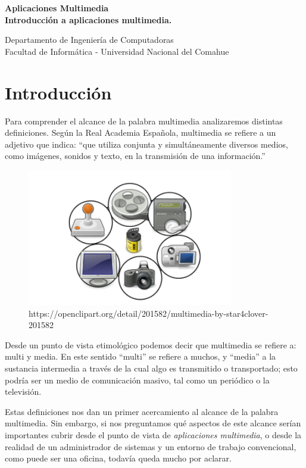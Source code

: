 \documentclass[12pt]{article}
\def\maketitle{

 \makeatletter
 {\color{bl} \centering \huge \sc \textbf{
  Aplicaciones Multimedia\\ 
\large \vspace*{-8pt} \color{black}Introducción a aplicaciones multimedia. 
 \vspace*{8pt} }\par}
 \makeatother

\makeatletter
 {\centering \small 
 	Departamento de Ingeniería de Computadoras \\
 	Facultad de Informática - Universidad Nacional del Comahue \\
 	\vspace{20pt} }
 \makeatother

}
\begin{document}
\thispagestyle{empty}
\maketitle
\setlength{\parindent}{0pt}

\section*{Introducción}

Para comprender el alcance de la palabra multimedia analizaremos distintas 
definiciones. Según la Real Academia Española, multimedia se refiere a un 
adjetivo que indica: ``que utiliza conjunta y simultáneamente diversos 
medios, como imágenes, sonidos y texto, en la transmisión de una 
información.''\cite{raemm}


\begin{figure}[h]
\centering
\includegraphics[width=0.8\textwidth]{multimedia.png}
\renewcommand{\figurename}{Fig.}
\caption{https://openclipart.org/detail/201582/multimedia-by-star4clover-201582}
\label{contexto:figura}
\end{figure}

Desde un punto de vista etimológico podemos decir que multimedia se 
refiere a: multi y media. En este sentido ``multi'' se refiere a  muchos, y ``media'' a la
sustancia intermedia a través de la cual algo es transmitido o 
transportado; esto podría ser un medio de comunicación masivo, tal como un periódico o 
la televisión.\cite{ramyer}

Estas definiciones nos dan un primer acercamiento al alcance de la palabra
multimedia. Sin embargo, si nos preguntamos qué aspectos de este alcance 
serían importantes cubrir desde el punto de vista de {\it aplicaciones 
multimedia}, o desde la realidad de un administrador de sistemas y un 
entorno de trabajo convencional, como puede ser una oficina, todavía queda
mucho por aclarar. 
\end{document}
